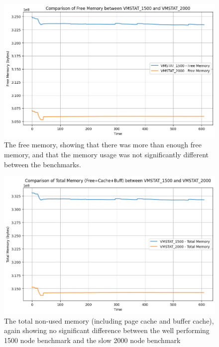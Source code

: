 \begin{figure}[H]
  \centering
  \includegraphics[width=\textwidth]{./plots/p1_freemem.png}
  \caption{The free memory, showing that there was more than enough free memory, and that the memory usage was not significantly different between the benchmarks.}
\end{figure}

\begin{figure}[H]
  \centering
  \includegraphics[width=\textwidth]{./plots/p1_totalmem.png}
  \caption{The total non-used memory (including page cache and buffer cache), again showing no significant difference between the well performing 1500 node benchmark and the slow 2000 node benchmark}
\end{figure}

